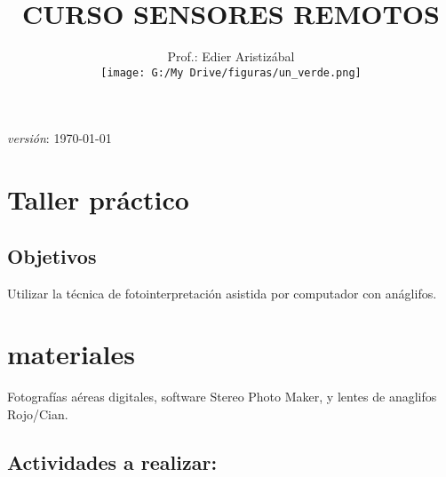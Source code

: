 \documentclass[a4paper,twoside,11pt,]{article}
\title {CURSO SENSORES REMOTOS}
\author{Prof.: Edier Aristizábal\\[5ex]
\texttt{[image: G:/My Drive/figuras/un\_verde.png]}
}
\date{}
\begin{document}
\maketitle

\emph {versión}: \today

\section* {Taller práctico}
\subsection*{Objetivos}
Utilizar la técnica de fotointerpretación asistida por computador con anáglifos.

\section*{materiales}
Fotografías aéreas digitales, software Stereo Photo Maker, y lentes de anaglifos Rojo/Cian.

\subsection*{Actividades a realizar:}
\end{document}
